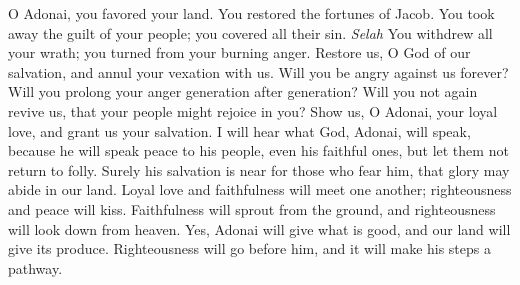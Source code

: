 \begin{biblechapter} %
 O Adonai, you favored your land. 
You restored the fortunes of Jacob.
\verse You took away the guilt of your people; 
you covered all their sin. \textit{Selah}
\verse You withdrew all your wrath; 
you turned from your burning anger.
\verse Restore us, O God of our salvation, 
and annul your vexation with us.
\verse Will you be angry against us forever? 
Will you prolong your anger generation after generation?
\verse Will you not again revive us, 
that your people might rejoice in you?
\verse Show us, O Adonai, your loyal love, 
and grant us your salvation.
\verse I will hear what God, Adonai, will speak, 
because he will speak peace 
to his people, even his faithful ones, 
but let them not return to folly.
\verse Surely his salvation is near for those who fear him, 
that glory may abide in our land.
\verse Loyal love and faithfulness will meet one another; 
righteousness and peace will kiss.
\verse Faithfulness will sprout from the ground, 
and righteousness will look down from heaven.
\verse Yes, Adonai will give what is good, 
and our land will give its produce.
\verse Righteousness will go before him, 
and it will make his steps a pathway.
\end{biblechapter}

